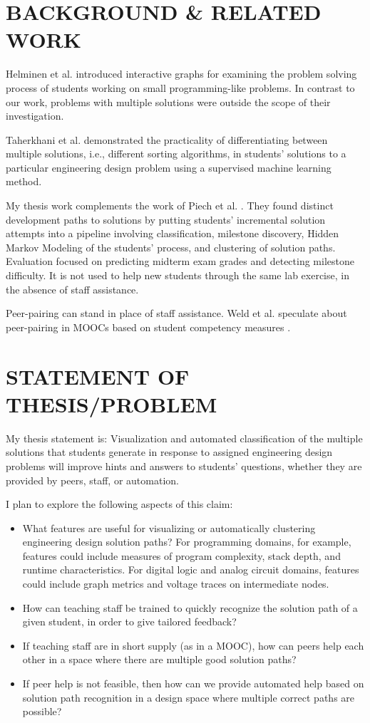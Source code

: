 \documentclass{sig-alternate-2013}
\begin{document}
\section{BACKGROUND \& RELATED WORK}


Helminen et al. \cite{ICERHelminen} introduced interactive graphs for examining the problem solving process of students working on small programming-like problems. In contrast to our work, problems with multiple solutions were outside the scope of their investigation.

Taherkhani et al. \cite{taherkhani12} demonstrated the practicality of differentiating between multiple solutions, i.e., different sorting algorithms, in students' solutions to a particular engineering design problem using a supervised machine learning method.

My thesis work complements the work of Piech et al. \cite{Piech}. They found distinct development paths to solutions by putting students' incremental solution attempts into a pipeline involving classification, milestone discovery, Hidden Markov Modeling of the students' process, and clustering of solution paths. Evaluation focused on predicting midterm exam grades and detecting milestone difficulty. It is not used to help new students through the same lab exercise, in the absence of staff assistance.

Peer-pairing can stand in place of staff assistance. Weld et al. speculate about peer-pairing in MOOCs based on student competency measures \cite{WeldHcomp12}.



\section{STATEMENT OF THESIS/PROBLEM}

My thesis statement is: Visualization and automated classification of the multiple solutions that students generate in response to assigned engineering design problems will improve hints and answers to students' questions, whether they are provided by peers, staff, or automation. 

I plan to explore the following aspects of this claim:
\begin{itemize}
\item What features are useful for visualizing or automatically clustering engineering design solution paths? For programming domains, for example, features could include measures of program complexity, stack depth, and runtime characteristics. For digital logic and analog circuit domains, features could include graph metrics and voltage traces on intermediate nodes.
\item How can teaching staff be trained to quickly recognize the solution path of a given student, in order to give tailored feedback?
\item If teaching staff are in short supply (as in a MOOC), how can peers help each other in a space where there are multiple good solution paths?
\item If peer help is not feasible, then how can we provide automated help based on solution path recognition in a design space where multiple correct paths are possible?
\end{itemize}
\end{document}
